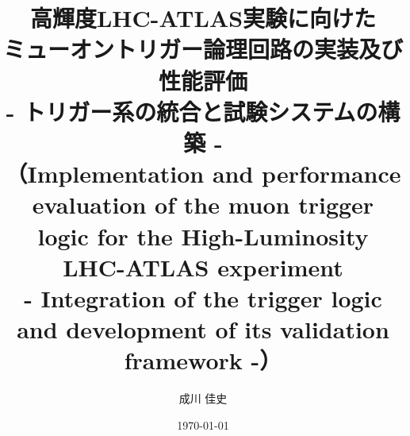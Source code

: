 \title{\huge 高輝度LHC-ATLAS実験に向けた\\ミューオントリガー論理回路の実装及び性能評価\\- トリガー系の統合と試験システムの構築 - \vspace{1cm}\\ \Large（Implementation and performance evaluation of the muon trigger logic for
the High-Luminosity LHC-ATLAS experiment \\- Integration of the trigger
logic and development of its validation framework -）} %
\date{\today} %
\author{成川 佳史} %
\seifuku{} %
